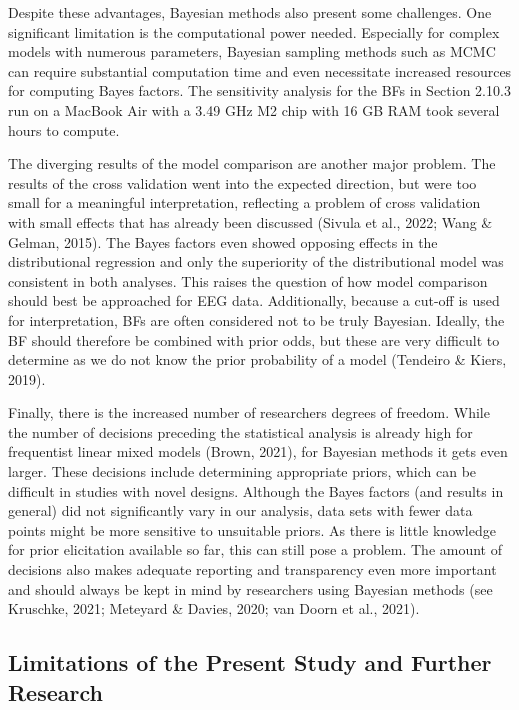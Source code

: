 \documentclass[
  doc,12pt,floatsintext]{apa7}
\begin{document}
Despite these advantages, Bayesian methods also present some challenges. One significant limitation is the computational power needed. Especially for complex models with numerous parameters, Bayesian sampling methods such as MCMC can require substantial computation time and even necessitate increased resources for computing Bayes factors. The sensitivity analysis for the BFs in Section 2.10.3 run on a MacBook Air with a 3.49 GHz M2 chip with 16 GB RAM took several hours to compute.

The diverging results of the model comparison are another major problem. The results of the cross validation went into the expected direction, but were too small for a meaningful interpretation, reflecting a problem of cross validation with small effects that has already been discussed (Sivula et al., 2022; Wang \& Gelman, 2015). The Bayes factors even showed opposing effects in the distributional regression and only the superiority of the distributional model was consistent in both analyses. This raises the question of how model comparison should best be approached for EEG data. Additionally, because a cut-off is used for interpretation, BFs are often considered not to be truly Bayesian. Ideally, the BF should therefore be combined with prior odds, but these are very difficult to determine as we do not know the prior probability of a model (Tendeiro \& Kiers, 2019).

Finally, there is the increased number of researchers degrees of freedom. While the number of decisions preceding the statistical analysis is already high for frequentist linear mixed models (Brown, 2021), for Bayesian methods it gets even larger. These decisions include determining appropriate priors, which can be difficult in studies with novel designs. Although the Bayes factors (and results in general) did not significantly vary in our analysis, data sets with fewer data points might be more sensitive to unsuitable priors. As there is little knowledge for prior elicitation available so far, this can still pose a problem. The amount of decisions also makes adequate reporting and transparency even more important and should always be kept in mind by researchers using Bayesian methods (see Kruschke, 2021; Meteyard \& Davies, 2020; van Doorn et al., 2021).

\subsection{Limitations of the Present Study and Further Research}\label{limitations-of-the-present-study-and-further-research}
\end{document}
